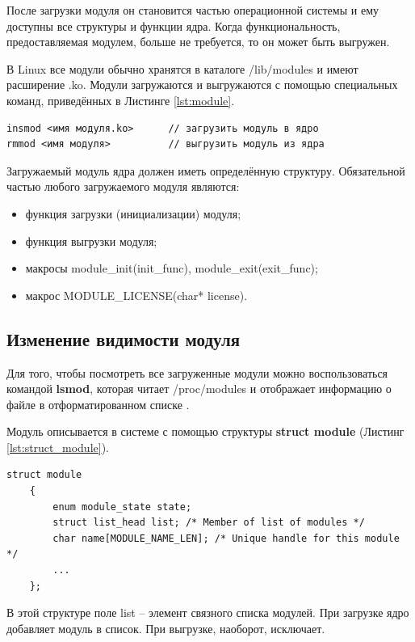После загрузки модуля он становится частью операционной системы и ему доступны все структуры и функции ядра. Когда функциональность, предоставляемая модулем, больше не требуется, то он может быть выгружен.

В Linux все модули обычно хранятся в каталоге /lib/modules и имеют расширение .ko. Модули загружаются и выгружаются с помощью специальных команд, приведённых в Листинге \ref{lst:module}.

\begin{lstlisting}[caption = {Команды для загрузки и выгрузки загружаемого модуля ядра}, label=lst:module]
insmod <имя модуля.ko>		// загрузить модуль в ядро
rmmod <имя модуля>			// выгрузить модуль из ядра
\end{lstlisting}

Загружаемый модуль ядра должен иметь определённую структуру. Обязательной частью любого загружаемого модуля являются:
\begin{itemize}
	\item функция загрузки (инициализации) модуля;
	
	\item функция выгрузки модуля; 
	
	\item макросы module\_init(init\_func), module\_exit(exit\_func);
	
	\item макрос MODULE\_LICENSE(char* license). \newline
\end{itemize}

\subsection{Изменение видимости модуля}
Для того, чтобы посмотреть все загруженные модули можно воспользоваться командой \textbf{lsmod}, которая читает /proc/modules и отображает информацию о файле в отформатированном списке \cite{lsmod}. 

Модуль описывается в системе с помощью структуры \textbf{struct module} (Листинг \ref{lst:struct_module}).
\begin{lstlisting}[caption = {struct module}, label=lst:struct_module]
	struct module
	{
		enum module_state state;
		struct list_head list; /* Member of list of modules */
		char name[MODULE_NAME_LEN]; /* Unique handle for this module */
		...
	};
\end{lstlisting}

В этой структуре поле list -- элемент связного списка модулей. При загрузке ядро добавляет модуль в список. При выгрузке, наоборот, исключает. 

